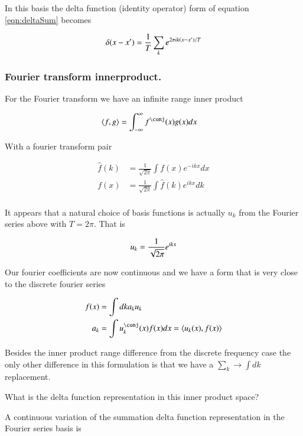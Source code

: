 \documentclass{article}
\newcommand{\IIinf}[0]{ \int_{-\infty}^\infty }
\newcommand{\Innerprod}[2]{\left\langle{#1}, {#2}\right\rangle}
\begin{document}
In this basis the 
delta function (identity operator) form of equation \ref{eqn:deltaSum}
becomes

\begin{align*}
\delta(x- x') = \frac{1}{{T}} \sum_k e^{ 2 \pi i k (x-x') / T}
\end{align*}

\subsubsection{ Fourier transform innerproduct. }

For the Fourier transform we have an infinite range inner product

\begin{align*}
\Innerprod{f}{g} &= \IIinf f^\conj(x) g(x) dx
\end{align*}

With a fourier transform pair 

\begin{align*}
\hat{f}(k) &= \frac{1}{\sqrt{2\pi}} \int f(x) e^{-i k x} dx \\
{f}(x) &= \frac{1}{\sqrt{2\pi}} \int \hat{f}(k) e^{i k x } dk \\
\end{align*}

It appears that a natural choice of basis functions is actually $u_k$ from the
Fourier series above with $T=2\pi$.  That is

\begin{align*}
u_k = \frac{1}{\sqrt{2\pi}} e^{i k x}
\end{align*}

Our fourier coefficients are now continuous and we have a form that
is very close to the discrete fourier series

\begin{align*}
f(x) 
&= \int dk a_k u_k \\
a_k &= \int u_k^\conj(x) f(x) dx = \Innerprod{u_k(x)}{f(x)} \\
\end{align*}

Besides the inner product range difference from the discrete frequency case
the only other difference in this formulation is that we have a 
$\sum_k \rightarrow \int dk$ replacement.

What is the delta function representation in this inner product space?

A continuous variation of the summation delta function representation
in the Fourier series basis is
\end{document}

